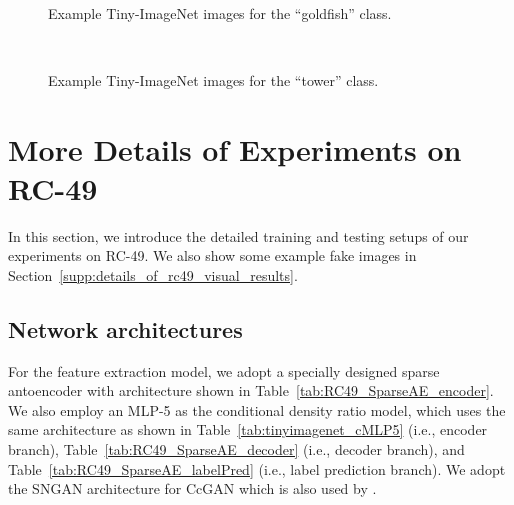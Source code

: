 \documentclass[10pt, twocolumn]{article}
\theoremstyle{definition}
\begin{document}
\begin{figure*}[!htbp]
	\centering
	\\
	\quad
	\quad
	\caption{Example Tiny-ImageNet images for the ``goldfish'' class.}
	\label{fig:tiny-imagenet_visual_results_goldfish}
\end{figure*}

\begin{figure*}[!htbp]
	\centering
	\\
	\quad
	\quad
	\caption{Example Tiny-ImageNet images for the ``tower'' class.}
	\label{fig:tiny-imagenet_visual_results_tower}
\end{figure*}






\section{More Details of Experiments on RC-49} \label{supp:details_of_rc49}
In this section, we introduce the detailed training and testing setups of our experiments on RC-49. We also show some example fake images in Section~\ref{supp:details_of_rc49_visual_results}. 


\subsection{Network architectures}  \label{supp:net_arch_of_rc49}
For the feature extraction model, we adopt a specially designed sparse antoencoder with architecture shown in Table~\ref{tab:RC49_SparseAE_encoder}. We also employ an MLP-5 as the conditional density ratio model, which uses the same architecture as shown in Table~\ref{tab:tinyimagenet_cMLP5} (i.e., encoder branch), Table~\ref{tab:RC49_SparseAE_decoder} (i.e., decoder branch), and Table~\ref{tab:RC49_SparseAE_labelPred} (i.e., label prediction branch). We adopt the SNGAN architecture for CcGAN which is also used by \cite{ding2020continuous}.
\end{document}
